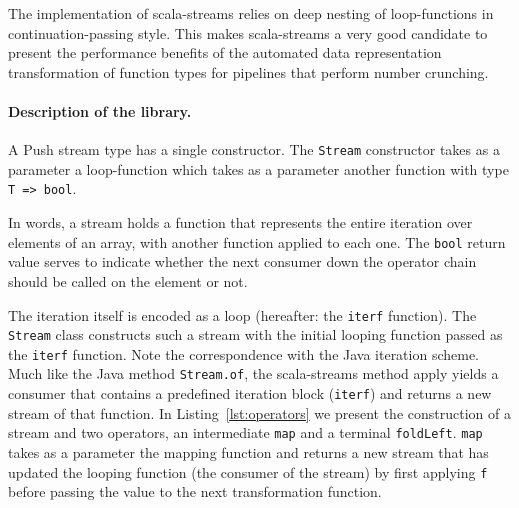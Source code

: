 The implementation of scala-streams relies on deep nesting of loop-functions in
continuation-passing style. This makes scala-streams a very good candidate to
present the performance benefits of the automated data representation
transformation of function types for pipelines that perform number crunching.

\paragraph{Description of the library. }
A Push stream type has a single constructor. The \verb|Stream| constructor takes
as a parameter a loop-function which takes as a parameter another function with
type \verb|T => bool|.

In words, a stream holds a function that represents the entire iteration over
elements of an array, with another function applied to each one.  The
\verb|bool| return value serves to indicate whether the next consumer down the
operator chain should be called on the element or not.

The iteration itself is encoded as a loop (hereafter: the \verb|iterf|
function). The \verb|Stream| class constructs such a stream with the initial
looping function passed as the \verb|iterf| function. Note the correspondence
with the Java iteration scheme. Much like the Java method \verb|Stream.of|, the
scala-streams method apply yields a consumer that contains a predefined
iteration block (\verb|iterf|) and returns a new stream of that function. In
Listing~\ref{lst:operators} we present the construction of a stream and two
operators, an intermediate \verb|map| and a terminal \verb|foldLeft|. \verb|map|
takes as a parameter the mapping function and returns a new stream that has
updated the looping function (the consumer of the stream) by first applying
\verb|f| before passing the value to the next transformation function.

